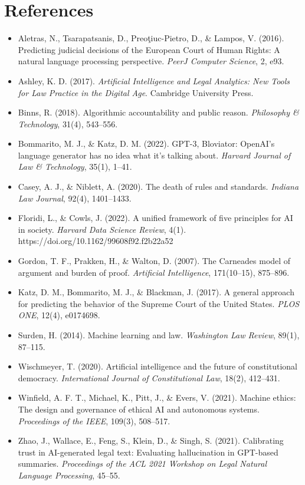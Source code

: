 \documentclass[12pt,a4paper]{article}
\begin{document}
\section*{References}
\begin{itemize}[leftmargin=*]
    \item Aletras, N., Tsarapatsanis, D., Preoţiuc-Pietro, D., \& Lampos, V. (2016). Predicting judicial decisions of the European Court of Human Rights: A natural language processing perspective. \textit{PeerJ Computer Science}, 2, e93.

    \item Ashley, K. D. (2017). \textit{Artificial Intelligence and Legal Analytics: New Tools for Law Practice in the Digital Age}. Cambridge University Press.

    \item Binns, R. (2018). Algorithmic accountability and public reason. \textit{Philosophy \& Technology}, 31(4), 543–556.

    \item Bommarito, M. J., \& Katz, D. M. (2022). GPT-3, Bloviator: OpenAI's language generator has no idea what it's talking about. \textit{Harvard Journal of Law \& Technology}, 35(1), 1–41.

    \item Casey, A. J., \& Niblett, A. (2020). The death of rules and standards. \textit{Indiana Law Journal}, 92(4), 1401–1433.

    \item Floridi, L., \& Cowls, J. (2022). A unified framework of five principles for AI in society. \textit{Harvard Data Science Review}, 4(1). https://doi.org/10.1162/99608f92.f2b22a52

    \item Gordon, T. F., Prakken, H., \& Walton, D. (2007). The Carneades model of argument and burden of proof. \textit{Artificial Intelligence}, 171(10–15), 875–896.

    \item Katz, D. M., Bommarito, M. J., \& Blackman, J. (2017). A general approach for predicting the behavior of the Supreme Court of the United States. \textit{PLOS ONE}, 12(4), e0174698.

    \item Surden, H. (2014). Machine learning and law. \textit{Washington Law Review}, 89(1), 87–115.

    \item Wischmeyer, T. (2020). Artificial intelligence and the future of constitutional democracy. \textit{International Journal of Constitutional Law}, 18(2), 412–431.

    \item Winfield, A. F. T., Michael, K., Pitt, J., \& Evers, V. (2021). Machine ethics: The design and governance of ethical AI and autonomous systems. \textit{Proceedings of the IEEE}, 109(3), 508–517.

    \item Zhao, J., Wallace, E., Feng, S., Klein, D., \& Singh, S. (2021). Calibrating trust in AI-generated legal text: Evaluating hallucination in GPT-based summaries. \textit{Proceedings of the ACL 2021 Workshop on Legal Natural Language Processing}, 45–55.
\end{itemize}
\end{document}
